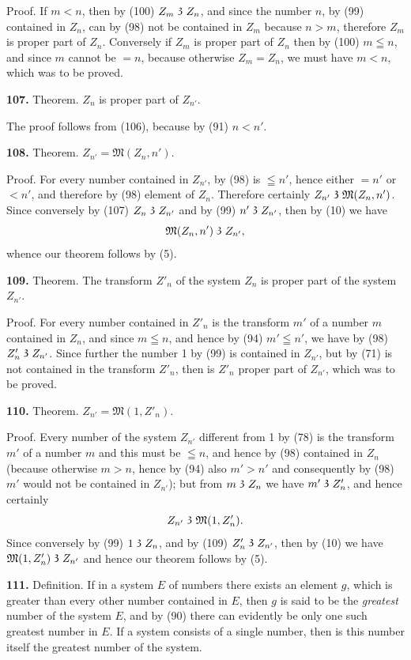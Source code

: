 \documentclass[oneside]{book}
\newcommand\partof{\mathrel{\raisebox{0.45ex}{$\mathfrak{3}$}}}   %
\newcommand\mypara{\medskip\textbf}
\begin{document}
Proof. If $m<n$, then by (100) $Z_m \partof Z_n$, and since
the number $n$, by (99) contained in $Z_n$, can by (98)
not be contained in $Z_m$ because $n>m$, therefore $Z_m$ is
proper part of $Z_n$. Conversely if $Z_m$ is proper part of
$Z_n$ then by (100) $m\leqq n$, and since $m$ cannot be $=n$,
because otherwise $Z_m=Z_n$, we must have $m<n$, which
was to be proved.

\mypara{107.} Theorem. $Z_n$ is proper part of $Z_{n'}$.

The proof follows from (106), because by (91)
$n<n'$.

\mypara{108.} Theorem. $Z_{n'}= \mathfrak{M}(Z_n,n')$.

Proof. For every number contained in $Z_{n'}$, by (98)
is $\leqq n'$, hence either $=n'$ or $<n'$, and therefore by (98)
element of $Z_n$. Therefore certainly $Z_{n'} \partof \mathfrak{M}(Z_n,n')$.
Since conversely by (107) $Z_n \partof Z_{n'}$ and by (99) $n' \partof Z_{n'}$,
then by (10) we have
\[
\mathfrak{M}(Z_n,n') \partof Z_{n'},
\]
whence our theorem follows by (5).

\mypara{109.} Theorem. The transform $Z'_n$ of the system
$Z_n$ is proper part of the system $Z_{n'}$.

Proof. For every number contained in $Z'_n$ is the
transform $m'$ of a number $m$ contained in $Z_n$, and since
$m \leqq n$, and hence by (94) $m' \leqq n'$, we have by (98)
$Z'_n \partof Z_{n'}$. Since further the number 1 by (99) is contained
in $Z_{n'}$, but by (71) is not contained in the transform
$Z'_n$, then is $Z'_n$ proper part of $Z_{n'}$, which was to
be proved.

\mypara{110.} Theorem. $Z_{n'} = \mathfrak{M}(1, Z'_n)$.

Proof. Every number of the system $Z_{n'}$ different
from 1 by (78) is the transform $m'$ of a number $m$ and
this must be $\leqq n$, and hence by (98) contained in $Z_n$
(because otherwise $m>n$, hence by (94) also $m'>n'$
and consequently by (98) $m'$ would not be contained
in $Z_{n'}$); but from $m \partof Z_n$ we have $m' \partof Z'_n$, and hence
certainly
\[
Z_{n'} \partof \mathfrak{M}(1, Z'_n).
\]
Since conversely by (99) $1 \partof Z_n$, and by (109) $Z'_n \partof Z_{n'}$,
then by (10) we have $\mathfrak{M}(1, Z'_n) \partof Z_{n'}$ and hence our
theorem follows by (5).

\mypara{111.} Definition.  If in a system $E$ of numbers
there exists an element $g$, which is greater than every
other number contained in $E$, then $g$ is said to be the
\textit{greatest} number of the system $E$, and by (90) there can
evidently be only one such greatest number in $E$. If
a system consists of a single number, then is this number
itself the greatest number of the system.
\end{document}
